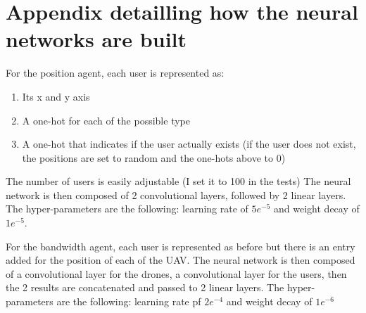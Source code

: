 \documentclass[letterpaper]{article}
\begin{document}




\appendix

\section{Appendix detailling how the neural networks are built}
\label{appendix}

For the position agent, each user is represented as:
\begin{enumerate}
    \item Its x and y axis
    \item A one-hot for each of the possible type
    \item A one-hot that indicates if the user actually exists (if the user does not exist, the positions are set to random and the one-hots above to 0)
\end{enumerate}

The number of users is easily adjustable (I set it to 100 in the tests)
The neural network is then composed of 2 convolutional layers, followed by 2 linear layers.
The hyper-parameters are the following: learning rate of $5e^{-5}$ and weight decay of $1e^{-5}$.

\;

For the bandwidth agent, each user is represented as before but there is an entry added for the position of each of the UAV.
The neural network is then composed of a convolutional layer for the drones, a convolutional layer for the users,
then the 2 results are concatenated and passed to 2 linear layers.
The hyper-parameters are the following: learning rate pf $2e^{-4}$ and weight decay of $1e^{-6}$
\end{document}
